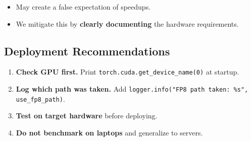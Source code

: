 \begin{itemize}
\item May create a false expectation of speedups.
\item We mitigate this by \textbf{clearly documenting} the hardware requirements.

\end{itemize}
\subsection{Deployment Recommendations}

\begin{enumerate}
\item \textbf{Check GPU first.} Print \texttt{torch.cuda.get\_device\_name(0)} at startup.
\item \textbf{Log which path was taken.} Add \texttt{logger.info("FP8 path taken: \%s", use\_fp8\_path)}.
\item \textbf{Test on target hardware} before deploying.
\item \textbf{Do not benchmark on laptops} and generalize to servers.

\end{enumerate}
